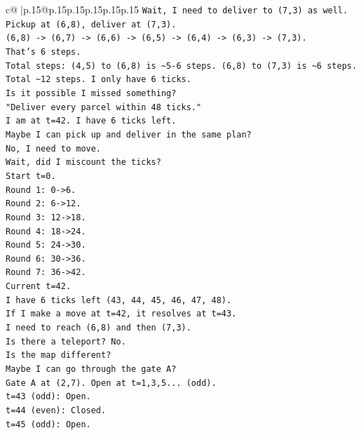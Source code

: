\documentclass{article}
\begin{document}
{\begin{supertabular}{c@{$\;$}|p{.15\linewidth}@{}p{.15\linewidth}p{.15\linewidth}p{.15\linewidth}p{.15\linewidth}p{.15\linewidth}}
{{{\texttt{Wait, I need to deliver to (7,3) as well.} \\
\texttt{Pickup at (6,8), deliver at (7,3).} \\
\texttt{(6,8) {-}> (6,7) {-}> (6,6) {-}> (6,5) {-}> (6,4) {-}> (6,3) {-}> (7,3).} \\
\texttt{That's 6 steps.} \\
\texttt{Total steps: (4,5) to (6,8) is \textasciitilde{}5{-}6 steps. (6,8) to (7,3) is \textasciitilde{}6 steps.} \\
\texttt{Total \textasciitilde{}12 steps. I only have 6 ticks.} \\
\texttt{Is it possible I missed something?} \\
\texttt{"Deliver every parcel within 48 ticks."} \\
\texttt{I am at t=42. I have 6 ticks left.} \\
\texttt{Maybe I can pick up and deliver in the same plan?} \\
\texttt{No, I need to move.} \\
\texttt{Wait, did I miscount the ticks?} \\
\texttt{Start t=0.} \\
\texttt{Round 1: 0{-}>6.} \\
\texttt{Round 2: 6{-}>12.} \\
\texttt{Round 3: 12{-}>18.} \\
\texttt{Round 4: 18{-}>24.} \\
\texttt{Round 5: 24{-}>30.} \\
\texttt{Round 6: 30{-}>36.} \\
\texttt{Round 7: 36{-}>42.} \\
\texttt{Current t=42.} \\
\texttt{I have 6 ticks left (43, 44, 45, 46, 47, 48).} \\
\texttt{If I make a move at t=42, it resolves at t=43.} \\
\texttt{I need to reach (6,8) and then (7,3).} \\
\texttt{Is there a teleport? No.} \\
\texttt{Is the map different?} \\
\texttt{Maybe I can go through the gate A?} \\
\texttt{Gate A at (2,7). Open at t=1,3,5... (odd).} \\
\texttt{t=43 (odd): Open.} \\
\texttt{t=44 (even): Closed.} \\
\texttt{t=45 (odd): Open.} \\
}}}
\end{supertabular}}
\end{document}

